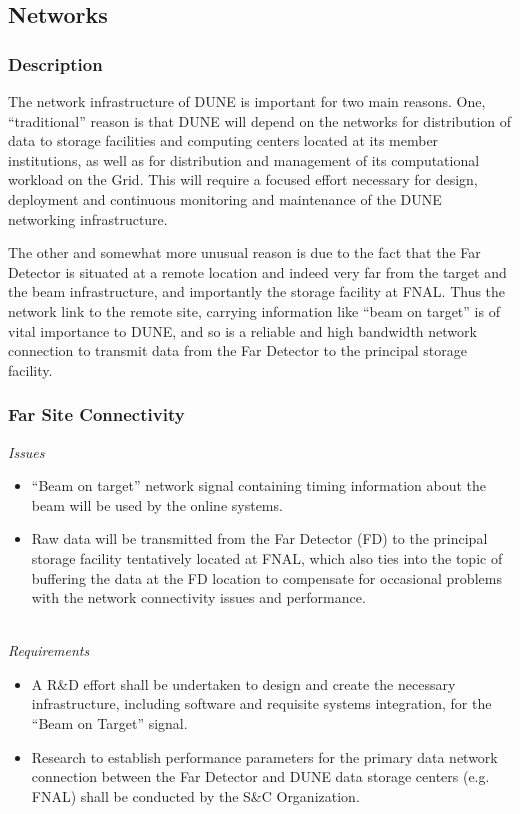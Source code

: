 \subsection{Networks}

\subsubsection{Description}
The network infrastructure of DUNE is important for two main reasons. One, “traditional” reason is that DUNE will depend on the networks for distribution of  data to storage facilities and computing centers located at its member institutions, as well as for distribution and management of its computational workload on the Grid. This will require a focused effort necessary for design, deployment and continuous monitoring and maintenance of the DUNE networking infrastructure.

The other and somewhat more unusual reason  is due to the fact that the Far Detector is situated at a remote location and indeed very far from the target and the beam infrastructure,  and importantly the storage facility at FNAL. Thus the network link to the remote site, carrying information like ``beam on target'' is of vital importance to DUNE, and so is a reliable and high bandwidth network connection to transmit data from the Far Detector to the principal storage facility.

\subsubsection{Far Site Connectivity}
\textit{Issues}

\begin{itemize}
	
	\item ``Beam on target'' network signal containing timing information about the beam will be used by the online systems.
	
	\item Raw data will be transmitted from the Far Detector (FD) to the principal storage facility tentatively located at FNAL, which also ties into the topic of buffering the data at the FD location to compensate for occasional problems with the network connectivity issues and performance.
	
\end{itemize}
\ 
\\
\textit{Requirements}
\begin{itemize}
	\item A R\&D effort shall be undertaken to design and create the necessary infrastructure, including software and requisite systems integration, 
	for the ``Beam on Target'' signal.
	
	\item Research to establish performance parameters for the primary data network connection between the Far Detector and  DUNE data storage centers (e.g. FNAL) shall be conducted by the S\&C Organization.
	
\end{itemize}

